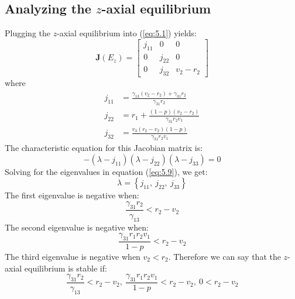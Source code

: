\subsection{Analyzing the $z$-axial equilibrium}\label{subsec:stability_z_axial_equilibrium}
Plugging the $z$-axial equilibrium into (\ref{eq:5.1}) yields:
\begin{equation}
    \textbf{J}\left(E_z\right)=\begin{bmatrix}
        j_{11} & 0 & 0\\
        0 & j_{22} & 0\\
        0 & j_{32} & v_2-r_2
    \end{bmatrix}
    \label{eq:5.8}
\end{equation}
where
\begin{align*}
    j_{11} &= \frac{\gamma_{13}\left(v_2-r_2\right)+\gamma_{31}r_2}{\gamma_{31}r_2}\\
    j_{22} &= r_1+\frac{\left(1-p\right)\left(v_2-r_2\right)}{\gamma_{31}r_2v_1}\\
    j_{32} &= \frac{v_3\left(r_2-v_2\right)\left(1-p\right)}{\gamma_{31}r_2v_1}
\end{align*}
The characteristic equation for this Jacobian matrix is:
\begin{equation}
    -\left(\lambda-j_{11}\right)\left(\lambda-j_{22}\right)\left(\lambda-j_{33}\right)=0
    \label{eq:5.9}
\end{equation}
Solving for the eigenvalues in equation (\ref{eq:5.9}), we get:
\[
\lambda=\left\{
j_{11}, \
j_{22}, \
j_{33}
\right\}
\]
The first eigenvalue is negative when:
\[
\frac{\gamma_{31}r_2}{\gamma_{13}}<r_2-v_2
\]
The second eigenvalue is negative when:
\[
\frac{\gamma_{31}r_1r_2v_1}{1-p}<r_2-v_2
\]
The third eigenvalue is negative when $v_2<r_2$. Therefore we can say that the $z$-axial equilibrium is stable if:
\[
\frac{\gamma_{31}r_2}{\gamma_{13}}<r_2-v_2,\ \frac{\gamma_{31}r_1r_2v_1}{1-p}<r_2-v_2,\ 0<r_2-v_2
\]

